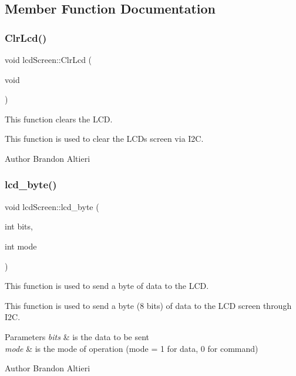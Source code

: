 \subsection{Member Function Documentation}
\mbox{\label{classlcdScreen_a5c1031c6ad92f717e4cec1f9ac6c02c5}} 
\subsubsection{\texorpdfstring{Clr\+Lcd()}{ClrLcd()}}
{\footnotesize\ttfamily void lcd\+Screen\+::\+Clr\+Lcd (\begin{DoxyParamCaption}\item[{void}]{ }\end{DoxyParamCaption})\hspace{0.3cm}{\ttfamily [private]}}



This function clears the L\+CD. 

This function is used to clear the L\+CD\textquotesingle{}s screen via I2C.

\begin{DoxyAuthor}{Author}
Brandon Altieri 
\end{DoxyAuthor}
\mbox{\label{classlcdScreen_a3762af911a7fbf78839f0edcd547e042}} 
\subsubsection{\texorpdfstring{lcd\+\_\+byte()}{lcd\_byte()}}
{\footnotesize\ttfamily void lcd\+Screen\+::lcd\+\_\+byte (\begin{DoxyParamCaption}\item[{int}]{bits,  }\item[{int}]{mode }\end{DoxyParamCaption})\hspace{0.3cm}{\ttfamily [private]}}



This function is used to send a byte of data to the L\+CD. 

This function is used to send a byte (8 bits) of data to the L\+CD screen through I2C.


\begin{DoxyParams}{Parameters}
{\em bits} & is the data to be sent \\
\hline
{\em mode} & is the mode of operation (mode = 1 for data, 0 for command) \\
\hline
\end{DoxyParams}
\begin{DoxyAuthor}{Author}
Brandon Altieri 
\end{DoxyAuthor}
\mbox{\label{classlcdScreen_a070d49963617592f52e359e78dcc1160}} 
